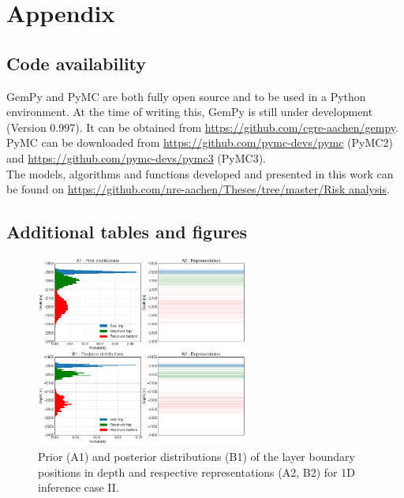 \documentclass[a4paper,11pt]{MScThesis}
\begin{document}
\cleardoublepage
		
		
		
		




%
    


\appendix

    \chapter{Appendix}
    \section{Code availability}
    	GemPy and PyMC are both fully open source and to be used in a Python environment. At the time of writing this, GemPy is still under development (Version 0.997). It can be obtained from \url{https://github.com/cgre-aachen/gempy}. PyMC can be downloaded from \url{https://github.com/pymc-devs/pymc} (PyMC2) and \url{https://github.com/pymc-devs/pymc3} (PyMC3).\\
    	The models, algorithms and functions developed and presented in this work can be found on \url{https://github.com/nre-aachen/Theses/tree/master/Risk analysis}.

    \section{Additional tables and figures}
    
    \begin{figure}[h]
    	\centering
    	\includegraphics[width=0.62\textwidth]{Figures/Appendix/update_goodseal1}
    	\caption{Prior (A1) and posterior distributions (B1) of the layer boundary positions in depth and respective representations (A2, B2) for 1D inference case II.}\label{fig:update_goodseal1}
    \end{figure}
\end{document}
